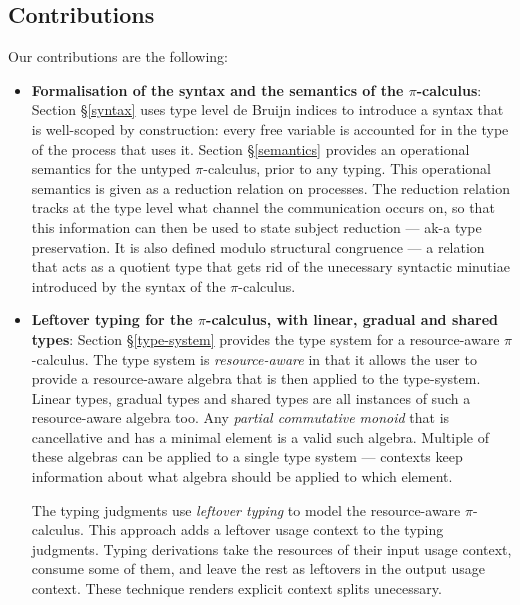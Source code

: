 \documentclass[a4paper,UKenglish,cleveref, autoref, thm-restate,authorcolumns]{lipics-v2019}
\theoremstyle{definition}
\newcommand{\picalc}{$\pi$-calculus}
\begin{document}
\subsection{Contributions}
Our contributions are the following:
\begin{itemize}
\item \textbf{Formalisation of the syntax and the semantics of the \picalc{}}:
  Section \S \ref{syntax} uses type level de Bruijn indices \cite{} to introduce a syntax that is well-scoped by construction: every free variable is accounted for in the type of the process that uses it.
  Section \S \ref{semantics} provides an operational semantics for the untyped \picalc{}, prior to any typing.
  This operational semantics is given as a reduction relation on processes.
  The reduction relation tracks at the type level what channel the communication occurs on, so that this information can then be used to state subject reduction --- ak-a type preservation.
  It is also defined modulo structural congruence --- a relation that acts as a quotient type that gets rid of the unecessary syntactic minutiae introduced by the syntax of the \picalc{}.

  \item \textbf{Leftover typing for the \picalc{}, with linear, gradual and shared types}:
  Section \S \ref{type-system} provides the type system for a resource-aware \picalc{}.
  The type system is \emph{resource-aware} in that it allows the user to provide a resource-aware algebra that is then applied to the type-system.
  Linear types, gradual types and shared types are all instances of such a resource-aware algebra too.
  Any \emph{partial commutative monoid} that is cancellative and has a minimal element is a valid such algebra.
  Multiple of these algebras can be applied to a single type system --- contexts keep information about what algebra should be applied to which element.

  The typing judgments use \emph{leftover typing} to model the resource-aware \picalc{}.
  This approach adds a leftover usage context to the typing judgments.
  Typing derivations take the resources of their input usage context, consume some of them, and leave the rest as leftovers in the output usage context.
  These technique renders explicit context splits unecessary.


\end{itemize}
\end{document}
